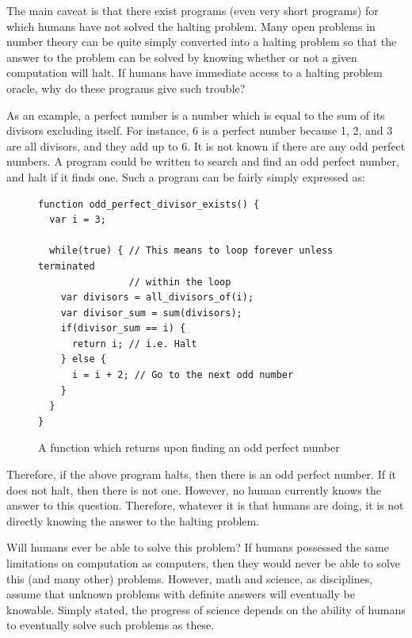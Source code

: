 The main caveat is that there exist programs (even very short programs) for which humans have not solved the halting problem.  Many open problems in number theory can be quite simply converted into a halting problem so that the answer to the problem can be solved by knowing whether or not a given computation will halt.  If humans have immediate access to a halting problem oracle, why do these programs give such trouble?

As an example, a perfect number is a number which is equal to the sum of its divisors excluding itself.  For instance, 6 is a perfect number because 1, 2, and 3 are all divisors, and they add up to 6.  It is not known if there are any odd perfect numbers.  A program could be written to search and find an odd perfect number, and halt if it finds one.  Such a program can be fairly simply expressed as:

\begin{figure}[H]
\begin{mdframed}
\begin{verbatim}
function odd_perfect_divisor_exists() {
  var i = 3;

  while(true) { // This means to loop forever unless terminated 
                // within the loop
    var divisors = all_divisors_of(i);
    var divisor_sum = sum(divisors);
    if(divisor_sum == i) {
      return i; // i.e. Halt
    } else {
      i = i + 2; // Go to the next odd number
    }
  }
}
\end{verbatim}
\end{mdframed}
\caption{A function which returns upon finding an odd perfect number}
\end{figure}

Therefore, if the above program halts, then there is an odd perfect number.  If it does not halt, then there is not one.  However, no human currently knows the answer to this question.  Therefore, whatever it is that humans are doing, it is not directly knowing the answer to the halting problem.

Will humans ever be able to solve this problem?  If humans possessed the same limitations on computation as computers, then they would never be able to solve this (and many other) problems.  However, math and science, as disciplines, assume that unknown problems with definite answers will eventually be knowable.  Simply stated, the progress of science depends on the ability of humans to eventually solve such problems as these.

